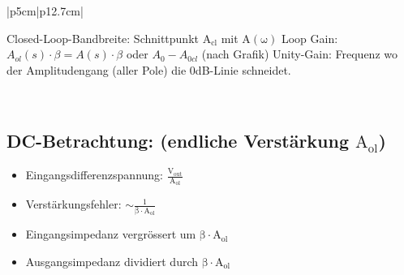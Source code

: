 \begin{longtable}[t]{|p{5cm}|p{12.7cm}|}
{ \newline
        Closed-Loop-Bandbreite: Schnittpunkt $$ mit $$\newline
        Loop Gain: $A_{ol}(s) \cdot \beta = A(s) \cdot \beta$ oder $A_0 - A_{0cl}$ (nach Grafik) \newline
        Unity-Gain: Frequenz wo der Amplitudengang (aller Pole) die 0dB-Linie schneidet.
    }
    \\ \hline
\end{longtable}


\subsection{DC-Betrachtung: (endliche Verstärkung $\mathrm{A_{ol}}$)}
\begin{itemize}
    \item Eingangsdifferenzspannung: $\mathrm{\frac{V_{out}}{A_{ol}}}$
    \item Verstärkungsfehler: $\mathrm{\sim\frac{1}{\beta \cdot A_{ol}}}$
    \item Eingangsimpedanz vergrössert um $\mathrm{\beta \cdot A_{ol}}$
    \item Ausgangsimpedanz dividiert durch $\mathrm{\beta \cdot A_{ol}}$
  \end{itemize}  
